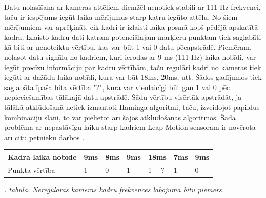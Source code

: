 \documentclass[12pt, a4paper, oneside, openright]{article}
\renewcommand{\thectables}{\arabic{ctables}}
\begin{document}
\par 
Datu nolasīšana ar kameras attēliem diemžēl nenotiek stabili ar 111 Hz frekvenci, taču ir iespējams
iegūt laika mērījumus starp katru iegūto attēlu. No šiem mērījumiem var aprēķināt, cik kadri ir izlaisti
laika posmā kopš pēdējā apskatītā kadra. Izlaisto kadru dati katram potenciālajam marķieru punktam 
tiek saglabāti kā biti ar nenoteiktu vērtību, kas var būt 1 vai 0 datu pēcapstrādē. 
Piemēram, nolasot datu signālu no kadriem, kuri ierodas ar 9 ms (111 Hz) laika nobīdi, var iegūt precīzu
informāciju par kadru vērtībām, taču regulāri kadri no kameras tiek iegūti ar dažādu laika nobīdi, kura
var būt 18ms, 20ms, utt. Šādos gadījumos tiek saglabāta īpaša bita vērtība "?", kura var vienlaicīgi būt
gan 1 vai 0 pēc nepieciešamības tālākajā datu apstrādē. Šādu vērtību visērtāk apstrādāt, ja tālākā atkļūdošanā
netiek izmantoti Haminga algoritmi, taču, izveidojot papildus kombināciju slāni, to var pielietot arī šajos
atkļūdošanas algoritmos. Šāda problēma ar nepastāvīgu laiku starp kadriem Leap Motion sensoram ir novērota arī citu pētnieku darbos \cite{JozeGuna2014}.

\begin{samepage}
\begin{table}[h]
\centering
\begin{tabular}{|l|l|l|l|l|l|l|l|}
\hline
Kadra laika nobīde & 9ms & 8ms & 9ms & \multicolumn{2}{l|}{18ms}     & 7ms & 9ms \\ \hline
Punkta vērtība     & 1   & 0   & 1   & 1 & \cellcolor[HTML]{FFCCC9}? & 1   & 0   \\ \hline
\end{tabular}
\end{table}
\vspace{-0.5cm}
\label{ctables:hamming_1}
\begin{center}
\footnotesize{
\textit{\thectables. tabula. Neregulāras kameras kadru frekvences labojuma bitu piemērs.}}
\end{center}
\end{samepage}
\end{document}
